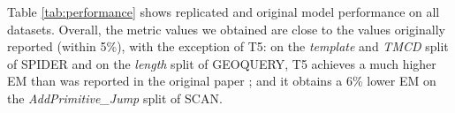 
Table \ref{tab:performance} shows replicated and original model performance on all datasets.
Overall, the metric values we obtained are close to the values originally reported (within 5\%), with the exception of T5: on the \textit{template} and \textit{TMCD} split of SPIDER and on the \textit{length} split of GEOQUERY, T5 achieves a much higher EM than was reported in the original paper \cite{shaw-etal-2021-compositional}; and it obtains a 6\% lower EM on the \textit{AddPrimitive\_Jump} split of SCAN. 


